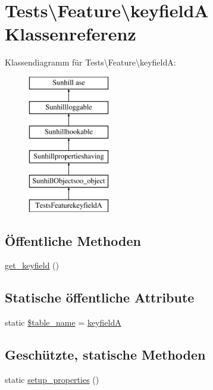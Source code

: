 \hypertarget{classTests_1_1Feature_1_1keyfieldA}{}\section{Tests\textbackslash{}Feature\textbackslash{}keyfieldA Klassenreferenz}
\label{classTests_1_1Feature_1_1keyfieldA}
Klassendiagramm für Tests\textbackslash{}Feature\textbackslash{}keyfieldA\+:\begin{figure}[H]
\begin{center}
\leavevmode
\includegraphics[height=6.000000cm]{d6/d71/classTests_1_1Feature_1_1keyfieldA}
\end{center}
\end{figure}
\subsection*{Öffentliche Methoden}
\begin{DoxyCompactItemize}
\item 
\hyperlink{classTests_1_1Feature_1_1keyfieldA_a8f32233408e0e139300173009478694d}{get\+\_\+keyfield} ()
\end{DoxyCompactItemize}
\subsection*{Statische öffentliche Attribute}
\begin{DoxyCompactItemize}
\item 
static \hyperlink{classTests_1_1Feature_1_1keyfieldA_a3f2b4308c7dfdcdf5c087dae94646af0}{\$table\+\_\+name} = \textquotesingle{}\hyperlink{classTests_1_1Feature_1_1keyfieldA}{keyfieldA}\textquotesingle{}
\end{DoxyCompactItemize}
\subsection*{Geschützte, statische Methoden}
\begin{DoxyCompactItemize}
\item 
static \hyperlink{classTests_1_1Feature_1_1keyfieldA_a13d1cc7038ec91024d911fc55303a44d}{setup\+\_\+properties} ()
\end{DoxyCompactItemize}

